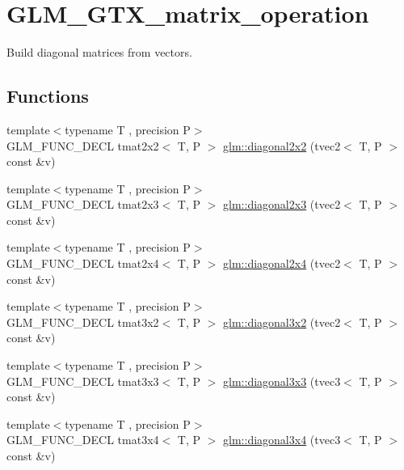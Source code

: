 \hypertarget{group__gtx__matrix__operation}{}\section{G\+L\+M\+\_\+\+G\+T\+X\+\_\+matrix\+\_\+operation}
\label{group__gtx__matrix__operation}


Build diagonal matrices from vectors.  


\subsection*{Functions}
\begin{DoxyCompactItemize}
\item 
{\footnotesize template$<$typename T , precision P$>$ }\\G\+L\+M\+\_\+\+F\+U\+N\+C\+\_\+\+D\+E\+C\+L tmat2x2$<$ T, P $>$ \hyperlink{group__gtx__matrix__operation_ga01dc503262dba9c457113d131fc8c024}{glm\+::diagonal2x2} (tvec2$<$ T, P $>$ const \&v)
\item 
{\footnotesize template$<$typename T , precision P$>$ }\\G\+L\+M\+\_\+\+F\+U\+N\+C\+\_\+\+D\+E\+C\+L tmat2x3$<$ T, P $>$ \hyperlink{group__gtx__matrix__operation_ga763817f07d6a94b722a48adfa87a35db}{glm\+::diagonal2x3} (tvec2$<$ T, P $>$ const \&v)
\item 
{\footnotesize template$<$typename T , precision P$>$ }\\G\+L\+M\+\_\+\+F\+U\+N\+C\+\_\+\+D\+E\+C\+L tmat2x4$<$ T, P $>$ \hyperlink{group__gtx__matrix__operation_ga49b37c819cf6dd8e35112ed1a13d45a3}{glm\+::diagonal2x4} (tvec2$<$ T, P $>$ const \&v)
\item 
{\footnotesize template$<$typename T , precision P$>$ }\\G\+L\+M\+\_\+\+F\+U\+N\+C\+\_\+\+D\+E\+C\+L tmat3x2$<$ T, P $>$ \hyperlink{group__gtx__matrix__operation_ga586e1ced91fd8a7c414186a200f13532}{glm\+::diagonal3x2} (tvec2$<$ T, P $>$ const \&v)
\item 
{\footnotesize template$<$typename T , precision P$>$ }\\G\+L\+M\+\_\+\+F\+U\+N\+C\+\_\+\+D\+E\+C\+L tmat3x3$<$ T, P $>$ \hyperlink{group__gtx__matrix__operation_ga8e817dba22f2305cdebae07bbbe0360c}{glm\+::diagonal3x3} (tvec3$<$ T, P $>$ const \&v)
\item 
{\footnotesize template$<$typename T , precision P$>$ }\\G\+L\+M\+\_\+\+F\+U\+N\+C\+\_\+\+D\+E\+C\+L tmat3x4$<$ T, P $>$ \hyperlink{group__gtx__matrix__operation_gae3f85af86c18c80f2acbe3223feb8e81}{glm\+::diagonal3x4} (tvec3$<$ T, P $>$ const \&v)

\end{DoxyCompactItemize}
